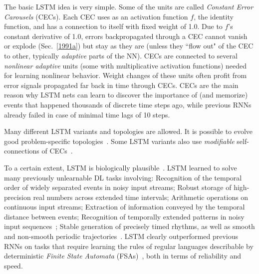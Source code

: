 \documentclass[letterpaper]{article}
\begin{document}
\begin{CJK*}{UTF8}{gbsn}
\begin{sloppypar}
The basic LSTM idea is very simple. Some of the units are called {\em Constant Error Carousels} (CECs).
Each CEC uses as an activation function $f$, the identity function, and 
has a connection to itself with fixed weight of 1.0. Due to $f$'s constant derivative of 1.0,  
errors backpropagated through a CEC cannot vanish or explode (Sec.~\ref{1991a})
but stay as they are (unless they ``flow out" 
of the CEC to other, typically {\em adaptive} parts of the NN). 
CECs are connected to several {\em nonlinear adaptive} units (some with multiplicative
activation functions) 
needed for learning nonlinear behavior. Weight changes of these units often 
profit from error signals propagated far back in time
through CECs. 
CECs are the main reason why LSTM nets can learn to discover the importance of (and memorize) events that happened thousands of discrete time steps ago, while previous RNNs already failed in case of minimal time lags of  10 steps.



Many different LSTM variants and topologies are allowed. 
It is possible to evolve good problem-specific topologies~\citep{DBLP:conf/icann/BayerWTS09}.
Some LSTM variants also use {\em modifiable} self-connections of CECs~\citep{Gers:01ieeetnn}.



To a certain extent, LSTM is biologically plausible~\citep{oreilly:2003}.
LSTM learned to solve many previously unlearnable DL tasks involving:
Recognition of the temporal order of widely separated events in noisy input streams; 
Robust storage of high-precision real numbers across extended time intervals;
Arithmetic operations on continuous input streams;
Extraction of information conveyed by the temporal distance between events;
Recognition of temporally extended patterns in noisy input sequences~\citep{lstm97and95,Gers:2000nc};
Stable generation of precisely timed rhythms, as well as 
smooth and non-smooth periodic trajectories~\citep{Gers:2000b}.
LSTM clearly outperformed
previous RNNs on tasks that
require learning the rules of regular languages describable
by deterministic {\em Finite State Automata} (FSAs)~\citep{Watrous:92nips,casey96dynamics,siegelmann93foundations,Blair+Pollack:1997nc,kalinke98computation,zeng94discrete,Manolios:94,Omlin:96,Omlin:04}, both in terms of reliability and speed.


\end{sloppypar}
\end{CJK*}
\end{document}
